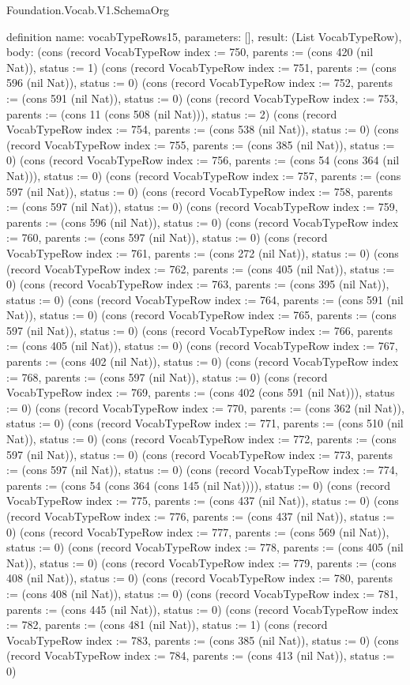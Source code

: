 \begin{lexlean}{Foundation.Vocab.V1.SchemaOrg}
\begin{semanticmodule}
definition{
  name: vocabTypeRows15,
  parameters: [],
  result: (List VocabTypeRow),
  body: (cons (record VocabTypeRow {index := 750, parents := (cons 420 (nil Nat)), status := 1}) (cons (record VocabTypeRow {index := 751, parents := (cons 596 (nil Nat)), status := 0}) (cons (record VocabTypeRow {index := 752, parents := (cons 591 (nil Nat)), status := 0}) (cons (record VocabTypeRow {index := 753, parents := (cons 11 (cons 508 (nil Nat))), status := 2}) (cons (record VocabTypeRow {index := 754, parents := (cons 538 (nil Nat)), status := 0}) (cons (record VocabTypeRow {index := 755, parents := (cons 385 (nil Nat)), status := 0}) (cons (record VocabTypeRow {index := 756, parents := (cons 54 (cons 364 (nil Nat))), status := 0}) (cons (record VocabTypeRow {index := 757, parents := (cons 597 (nil Nat)), status := 0}) (cons (record VocabTypeRow {index := 758, parents := (cons 597 (nil Nat)), status := 0}) (cons (record VocabTypeRow {index := 759, parents := (cons 596 (nil Nat)), status := 0}) (cons (record VocabTypeRow {index := 760, parents := (cons 597 (nil Nat)), status := 0}) (cons (record VocabTypeRow {index := 761, parents := (cons 272 (nil Nat)), status := 0}) (cons (record VocabTypeRow {index := 762, parents := (cons 405 (nil Nat)), status := 0}) (cons (record VocabTypeRow {index := 763, parents := (cons 395 (nil Nat)), status := 0}) (cons (record VocabTypeRow {index := 764, parents := (cons 591 (nil Nat)), status := 0}) (cons (record VocabTypeRow {index := 765, parents := (cons 597 (nil Nat)), status := 0}) (cons (record VocabTypeRow {index := 766, parents := (cons 405 (nil Nat)), status := 0}) (cons (record VocabTypeRow {index := 767, parents := (cons 402 (nil Nat)), status := 0}) (cons (record VocabTypeRow {index := 768, parents := (cons 597 (nil Nat)), status := 0}) (cons (record VocabTypeRow {index := 769, parents := (cons 402 (cons 591 (nil Nat))), status := 0}) (cons (record VocabTypeRow {index := 770, parents := (cons 362 (nil Nat)), status := 0}) (cons (record VocabTypeRow {index := 771, parents := (cons 510 (nil Nat)), status := 0}) (cons (record VocabTypeRow {index := 772, parents := (cons 597 (nil Nat)), status := 0}) (cons (record VocabTypeRow {index := 773, parents := (cons 597 (nil Nat)), status := 0}) (cons (record VocabTypeRow {index := 774, parents := (cons 54 (cons 364 (cons 145 (nil Nat)))), status := 0}) (cons (record VocabTypeRow {index := 775, parents := (cons 437 (nil Nat)), status := 0}) (cons (record VocabTypeRow {index := 776, parents := (cons 437 (nil Nat)), status := 0}) (cons (record VocabTypeRow {index := 777, parents := (cons 569 (nil Nat)), status := 0}) (cons (record VocabTypeRow {index := 778, parents := (cons 405 (nil Nat)), status := 0}) (cons (record VocabTypeRow {index := 779, parents := (cons 408 (nil Nat)), status := 0}) (cons (record VocabTypeRow {index := 780, parents := (cons 408 (nil Nat)), status := 0}) (cons (record VocabTypeRow {index := 781, parents := (cons 445 (nil Nat)), status := 0}) (cons (record VocabTypeRow {index := 782, parents := (cons 481 (nil Nat)), status := 1}) (cons (record VocabTypeRow {index := 783, parents := (cons 385 (nil Nat)), status := 0}) (cons (record VocabTypeRow {index := 784, parents := (cons 413 (nil Nat)), status := 0}) }
\end{semanticmodule}
\end{lexlean}
